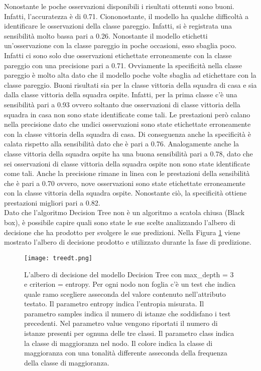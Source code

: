 Nonostante le poche osservazioni disponibili i risultati ottenuti sono buoni. Infatti, l'accuratezza è di 0.71. Ciononostante, il modello ha qualche difficoltà a identificare le osservazioni della classe pareggio. Infatti, si è registrata una sensibilità molto bassa pari a 0.26. Nonostante il modello etichetti un'osservazione con la classe pareggio in poche occasioni, esso sbaglia poco. Infatti ci sono solo due osservazioni etichettate erroneamente con la classe pareggio con una precisione pari a 0.71. Ovviamente la specificità nella classe pareggio è molto alta dato che il modello poche volte sbaglia ad etichettare con la classe pareggio. Buoni risultati sia per la classe vittoria della squadra di casa e sia dalla classe vittoria della squadra ospite. Infatti, per la prima classe c'è una sensibilità pari a 0.93 ovvero soltanto due osservazioni di classe vittoria della squadra in casa non sono state identificate come tali. Le prestazioni però calano nella precisione dato che undici osservazioni sono state etichettate erroneamente con la classe vittoria della squadra di casa. Di conseguenza anche la specificità è calata rispetto alla sensibilità dato che è pari a 0.76. Analogamente anche la classe vittoria della squadra ospite ha una buona sensibilità pari a 0.78, dato che sei osservazioni di classe vittoria della squadra ospite non sono state identificate come tali. Anche la precisione rimane in linea con le prestazioni della sensibilità che è pari a 0.70 ovvero, nove osservazioni sono state etichettate erroneamente con la classe vittoria della squadra ospite. Nonostante ciò, la specificità ottiene prestazioni migliori pari a 0.82.\\
Dato che l'algoritmo Decision Tree non è un algoritmo a scatola chiusa (Black box), è possibile capire quali sono state le sue scelte analizzando l'albero di decisione che ha prodotto per svolgere le sue predizioni. Nella Figura \ref{fig:dttree} viene mostrato l'albero di decisione prodotto e utilizzato durante la fase di predizione.
\begin{figure}[h]
	\begin{center}
		\texttt{[image: treedt.png]}
		\caption{L'albero di decisione del modello Decision Tree con max\_depth = 3 e criterion = entropy. Per ogni nodo non foglia c'è un test che indica quale ramo scegliere asseconda del valore contenuto nell'attributo testato. Il parametro \textsf{entropy} indica l'entropia misurata. Il parametro \textsf{samples} indica il numero di istanze che soddisfano i test precedenti. Nel parametro \textsf{value} vengono riportati il numero di istanze presenti per ognuna delle tre classi. Il parametro \textsf{class} indica la classe di maggioranza nel nodo. Il colore indica la classe di maggioranza con una tonalità differente asseconda della frequenza della classe di maggioranza.
		} 
		\label{fig:dttree}
	\end{center}
\end{figure}

